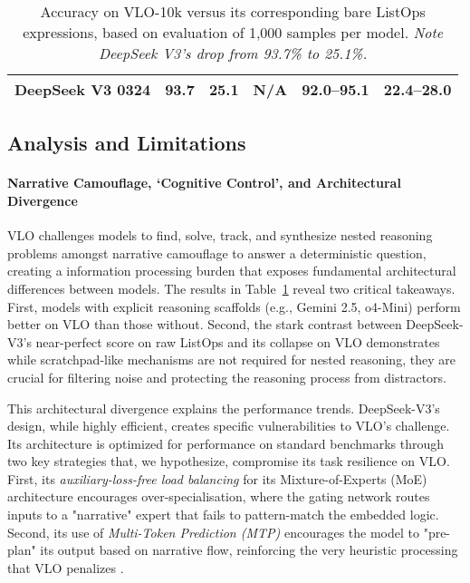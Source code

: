 \documentclass{article}
\begin{document}
\begin{table}[htbp]
{\begin{tabular}{l|ccc|cc}
      DeepSeek V3 0324          & 93.7             & 25.1             & N/A                                     & 92.0–95.1                  & 22.4–28.0              \\
      \bottomrule
    \end{tabular}
  }
  \vspace{4pt}
  \caption{Accuracy on VLO-10k versus its corresponding bare ListOps expressions, based on evaluation of 1,000 samples per model. \emph{Note DeepSeek V3's drop from 93.7\% to 25.1\%.}}
  \label{tab:model_performance_results}
\end{table}


\subsection{Analysis and Limitations}
\label{subsec:discussion}

\paragraph{Narrative Camouflage, `Cognitive Control', and Architectural Divergence}
VLO challenges models to find, solve, track, and synthesize nested reasoning problems amongst narrative camouflage to answer a deterministic question, creating a information processing burden that exposes fundamental architectural differences between models. The results in Table~\ref{tab:model_performance_results} reveal two critical takeaways. First, models with explicit reasoning scaffolds (e.g., Gemini 2.5, o4-Mini) perform better on VLO than those without. Second, the stark contrast between DeepSeek-V3's near-perfect score on raw ListOps and its collapse on VLO demonstrates while scratchpad-like mechanisms are not required for nested reasoning, they are crucial for filtering noise and protecting the reasoning process from distractors.

This architectural divergence explains the performance trends. DeepSeek-V3's design, while highly efficient, creates specific vulnerabilities to VLO's challenge. Its architecture is optimized for performance on standard benchmarks through two key strategies that, we hypothesize, compromise its task resilience on VLO. First, its \textit{auxiliary-loss-free load balancing} for its Mixture-of-Experts (MoE) architecture encourages over-specialisation, where the gating network routes inputs to a "narrative" expert that fails to pattern-match the embedded logic. Second, its use of \textit{Multi-Token Prediction (MTP)} encourages the model to "pre-plan" its output based on narrative flow, reinforcing the very heuristic processing that VLO penalizes \citep{deepseekv3}.
\end{document}
